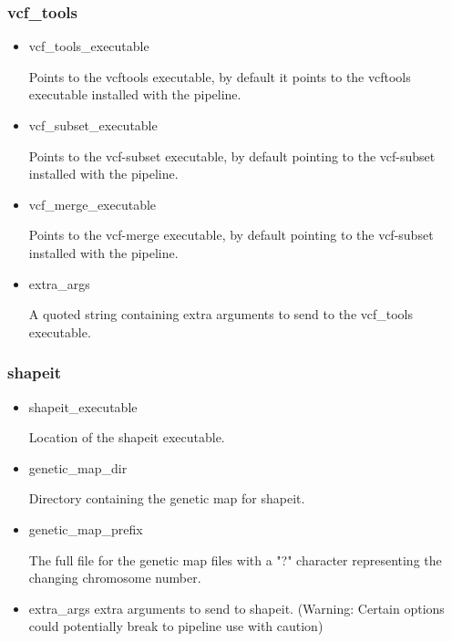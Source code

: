 \documentclass[a4paper,10pt]{article}
\begin{document}
\subsubsection{vcf\_tools}
\begin{itemize}
\item vcf\_tools\_executable 

Points to the vcftools executable, by default it points to the vcftools executable installed with the pipeline.
\item vcf\_subset\_executable 

Points to the vcf-subset executable, by default pointing to the vcf-subset installed with the pipeline.
\item vcf\_merge\_executable

Points to the vcf-merge executable, by default pointing to the vcf-subset installed with the pipeline.
\item extra\_args 

A quoted string containing extra arguments to send to the vcf\_tools executable.
\end{itemize}
\subsubsection{shapeit}
\begin{itemize}
\item shapeit\_executable

Location of the shapeit executable.
\item genetic\_map\_dir 

Directory containing the genetic map for shapeit.
\item genetic\_map\_prefix 

The full file for the genetic map files with a "?" character representing the changing chromosome number.
\item extra\_args 
extra arguments to send to shapeit. (Warning: Certain options could potentially break to pipeline use with caution)
\end{itemize}
\end{document}
